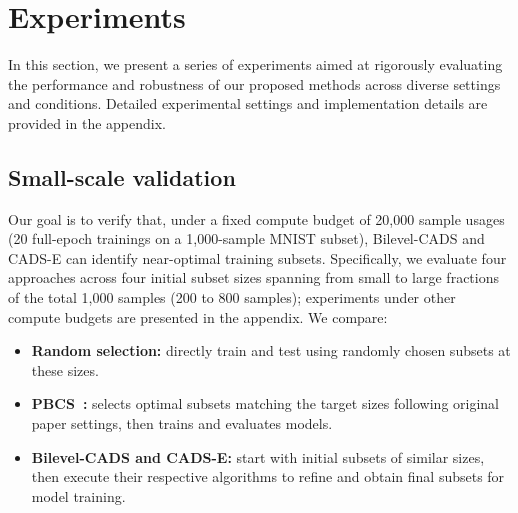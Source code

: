 \section{Experiments}
In this section, we present a series of experiments aimed at rigorously evaluating the performance and robustness of our proposed methods across diverse settings and conditions. Detailed experimental settings and implementation details are provided in the appendix.

\subsection{Small-scale validation}  
Our goal is to verify that, under a fixed compute budget of 20,000 sample usages (20 full-epoch trainings on a 1,000-sample MNIST subset), Bilevel-CADS and CADS-E can identify near-optimal training subsets. Specifically, we evaluate four approaches across four initial subset sizes spanning from small to large fractions of the total 1,000 samples (200 to 800 samples); experiments under other compute budgets are presented in the appendix. We compare:
\begin{itemize}
    \item \textbf{Random selection:} directly train and test using randomly chosen subsets at these sizes.
    \item \textbf{PBCS~\cite{ds_bi_zhou2022probabilistic}:} selects optimal subsets matching the target sizes following original paper settings, then trains and evaluates models.
    \item \textbf{Bilevel-CADS and CADS-E:} start with initial subsets of similar sizes, then execute their respective algorithms to refine and obtain final subsets for model training.
\end{itemize}

